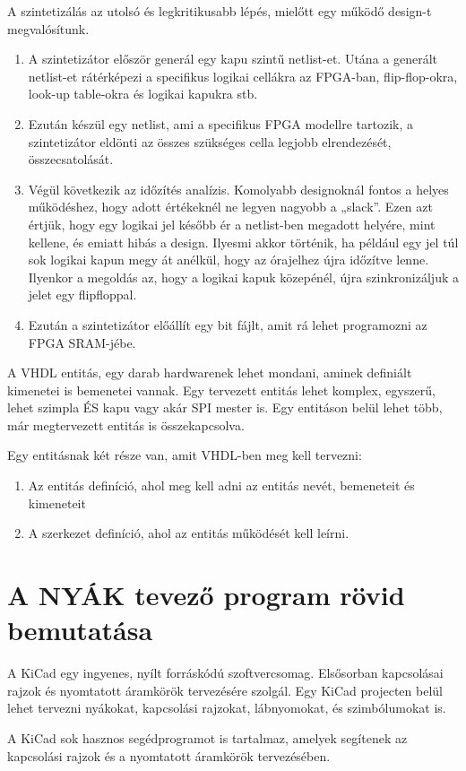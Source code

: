 \documentclass[a4paper,12pt,oneside]{book}
\begin{document}
A szintetizálás az utolsó és legkritikusabb lépés, mielőtt egy működő design-t megvalósítunk. 
\begin{enumerate}
	\item A szintetizátor először generál egy kapu szintű netlist-et. Utána a generált netlist-et rátérképezi a specifikus logikai cellákra az FPGA-ban, flip-flop-okra, look-up table-okra és logikai kapukra stb. 
	\item Ezután készül egy netlist, ami a specifikus FPGA modellre tartozik, a szintetizátor eldönti az összes szükséges cella legjobb elrendezését, összecsatolását. 
	\item Végül következik az időzítés analízis. Komolyabb designoknál fontos a helyes működéshez, hogy adott értékeknél ne legyen nagyobb a „slack”. Ezen azt értjük, hogy egy logikai jel később ér a netlist-ben megadott helyére, mint kellene, és emiatt hibás a design. Ilyesmi akkor történik, ha például egy jel túl sok logikai kapun megy át anélkül, hogy az órajelhez újra időzítve lenne. Ilyenkor a megoldás az, hogy a logikai kapuk közepénél, újra szinkronizáljuk a jelet egy flipfloppal.
	\item Ezután a szintetizátor előállít egy bit fájlt, amit rá lehet programozni az FPGA SRAM-jébe.  
\end{enumerate}
A VHDL entitás, egy darab hardwarenek lehet mondani, aminek definiált kimenetei is bemenetei vannak. Egy tervezett entitás lehet komplex, egyszerű, lehet szimpla ÉS kapu vagy akár SPI mester is. Egy entitáson belül lehet több, már megtervezett entitás is összekapcsolva. 

Egy entitásnak két része van, amit VHDL-ben meg kell tervezni: 
\begin{enumerate}
	\item Az entitás definíció, ahol meg kell adni az entitás nevét, bemeneteit és kimeneteit
	\item A szerkezet definíció, ahol az entitás működését kell leírni. 	  
\end{enumerate}

\section{A NYÁK tevező program rövid bemutatása}
A KiCad egy ingyenes, nyílt forráskódú szoftvercsomag. Elsősorban kapcsolásai rajzok és nyomtatott áramkörök tervezésére szolgál. Egy KiCad projecten belül lehet tervezni nyákokat, kapcsolási rajzokat, lábnyomokat, és szimbólumokat is.

A KiCad sok hasznos segédprogramot is tartalmaz, amelyek segítenek az kapcsolási rajzok és a nyomtatott áramkörök tervezésében. 
\end{document}
